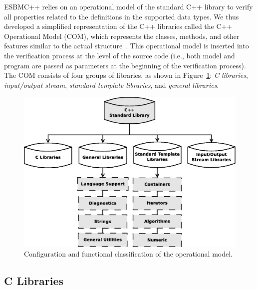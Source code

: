 \documentclass[a4paper]{llncs}
\begin{document}

ESBMC++ relies on an operational model of the standard C++ library to
verify all properties related to the definitions in the supported data
types.  We thus developed a simplified representation of the C++
libraries called the C++ Operational Model (COM), which represents the
classes, methods, and other features similar to the actual
structure~\cite{CppReference12}.  This operational model is inserted
into the verification process at the level of the source code (i.e.,
both model and program are passed as parameters at the beginning of the
verification process). The COM consists of four groups of libraries, as
shown in Figure~\ref{figure:cpp-diagram}: \emph{C libraries},
\emph{input/output stream}, \emph{standard template libraries}, and
\emph{general libraries}.

\begin{figure}[ht] \centering
\includegraphics[scale=0.28]{figures/diagramascpp} 
\caption{Configuration and functional classification of the operational model.}
\label{figure:cpp-diagram} 
\end{figure}

\subsection{C Libraries}
\end{document}

